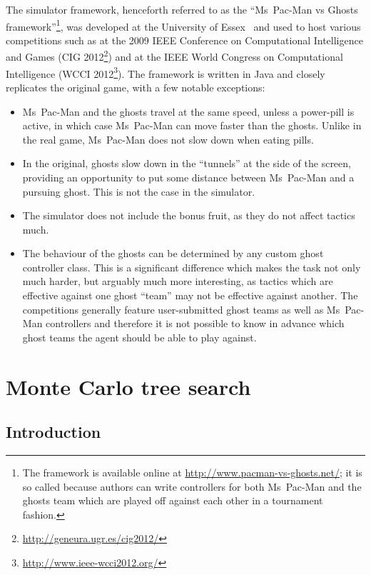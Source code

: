 The simulator framework, henceforth referred to as the ``Ms~Pac-Man vs Ghosts framework''\footnote{The framework is available online at \url{http://www.pacman-vs-ghosts.net/}; it is so called because authors can write controllers for both Ms~Pac-Man and the ghosts team which are played off against each other in a tournament fashion.}, was developed at the University of Essex~\citep{Robles2009} and used to host various competitions such as at the 2009 IEEE Conference on Computational Intelligence and Games (CIG 2012\footnote{\url{http://geneura.ugr.es/cig2012/}}) and at the IEEE World Congress on Computational Intelligence (WCCI 2012\footnote{\url{http://www.ieee-wcci2012.org/}}).  The framework is written in Java and closely replicates the original game, with a few notable exceptions:

\begin{itemize}
\item Ms~Pac-Man and the ghosts travel at the same speed, unless a power-pill is active, in which case Ms~Pac-Man can move faster than the ghosts.  Unlike in the real game, Ms~Pac-Man does not slow down when eating pills.
\item In the original, ghosts slow down in the ``tunnels'' at the side of the screen, providing an opportunity to put some distance between Ms~Pac-Man and a pursuing ghost.  This is not the case in the simulator.
\item The simulator does not include the bonus fruit, as they do not affect tactics much.
\item The behaviour of the ghosts can be determined by any custom ghost controller class.  This is a significant difference which makes the task not only much harder, but arguably much more interesting, as tactics which are effective against one ghost ``team'' may not be effective against another.  The competitions generally feature user-submitted ghost teams as well as Ms~Pac-Man controllers and therefore it is not possible to know in advance which ghost teams the agent should be able to play against.
\end{itemize}

\section{Monte Carlo tree search}

\subsection{Introduction}

